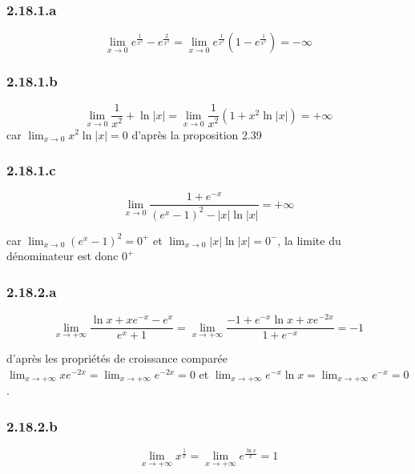 \documentclass[a4paper,10pt]{report}
\begin{document}
\subsubsection*{2.18.1.a}
\begin{displaymath}
	\lim_{x \rightarrow 0} e^{\frac{1}{x^2}} - e^{\frac{2}{x^2}}  = \lim_{x \rightarrow 0} e^{\frac{1}{x^2}}(1 - e^{\frac{1}{x^2}}) = -\infty
\end{displaymath}

\subsubsection*{2.18.1.b}
\begin{displaymath}
	\lim_{x \rightarrow 0} \frac{1}{x^2}  + \ln |x| = \lim_{x \rightarrow 0} \frac{1}{x^2}  (1+ x^2\ln |x|) = +\infty
\end{displaymath}
car $ \lim_{x \rightarrow 0} x^2\ln |x| = 0$ d'après la proposition 2.39

\subsubsection*{2.18.1.c}
\begin{displaymath}
	\lim_{x \rightarrow 0} \frac{1+e^{-x}}{(e^x-1)^2 - |x|\ln |x|} = + \infty
\end{displaymath}

car $ \lim_{x \rightarrow 0} (e^x-1)^2 = 0^{+}$ et $ \lim_{x \rightarrow 0} |x|\ln |x| = 0^{-}$, la limite du dénominateur est donc $0^{+}$

\subsubsection*{2.18.2.a}
\begin{displaymath}
	\lim_{x \rightarrow +\infty} \frac{\ln x + xe^{-x}-e^x}{e^x+1} = \lim_{x \rightarrow +\infty} \frac{-1 + e^{-x}\ln x + xe^{-2x}}{1 +e^{-x}} = -1
\end{displaymath}

d'après les propriétés de croissance comparée $\lim_{x \rightarrow +\infty} xe^{-2x} = \lim_{x \rightarrow +\infty} e^{-2x} = 0$ et 
$\lim_{x \rightarrow +\infty} e^{-x}\ln x = \lim_{x \rightarrow +\infty} e^{-x} =0 $.

\subsubsection*{2.18.2.b}
\begin{displaymath}
	\lim_{x \rightarrow +\infty} x^{\frac{1}{x}} = \lim_{x \rightarrow +\infty} e^\frac{\ln x}{x} = 1
\end{displaymath}
\end{document}
